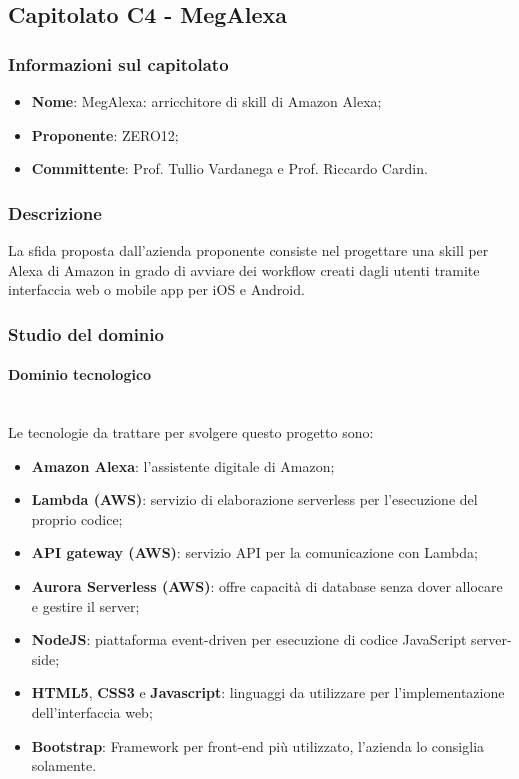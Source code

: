 \subsection{Capitolato C4 - MegAlexa}
\subsubsection{Informazioni sul capitolato}
\begin{itemize}
    \item \textbf{Nome}: MegAlexa: arricchitore di skill di Amazon Alexa;
	\item \textbf{Proponente}: ZERO12; 
	\item \textbf{Committente}: Prof. Tullio Vardanega e Prof. Riccardo Cardin.
\end{itemize}
\subsubsection{Descrizione}
La sfida proposta dall'azienda proponente consiste nel progettare una skill per Alexa di Amazon
in grado di avviare dei workflow creati dagli utenti tramite interfaccia web o
mobile app per iOS e Android.

\subsubsection{Studio del dominio}
\paragraph{Dominio tecnologico} \mbox{}\\
Le tecnologie da trattare per svolgere questo progetto sono:
\begin{itemize}
    \item \textbf{Amazon Alexa}: l'assistente digitale di Amazon;
    \item \textbf{Lambda (AWS)}: servizio di elaborazione serverless per l'esecuzione del proprio codice;
    \item \textbf{API gateway (AWS)}: servizio API per la comunicazione con Lambda;
    \item \textbf{Aurora Serverless (AWS)}: offre capacità di database senza dover allocare e gestire il server;
    \item \textbf{NodeJS}: piattaforma event-driven per esecuzione di codice JavaScript server-side;
    \item \textbf{HTML5}, \textbf{CSS3} e \textbf{Javascript}: linguaggi da utilizzare per l'implementazione
    dell'interfaccia web;
    \item \textbf{Bootstrap}: Framework per front-end più utilizzato, l'azienda lo consiglia solamente.
\end{itemize}
